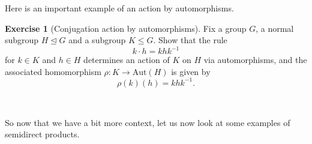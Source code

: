 \documentclass[12pt]{report}
\numberwithin{equation}{section}
\numberwithin{theorem}{chapter}
\theoremstyle{definition}
\newtheorem{exercise}{Exercise}
\newtheorem*{basic properties}{Basic Properties}
\newtheorem*{Important Remark}{Important Remark}
\newtheorem{remark}[theorem]{Remark}
\begin{document}
%


Here is an important example of an action by automorphisms.


\begin{exercise}[Conjugation action by automorphisms]
Fix a group $G$, a normal subgroup $H \trianglelefteq G$ and a subgroup $K \leq G$. Show that the rule
$$k \cdot h = khk^{-1}$$ 
for $k \in K$ and $h \in H$ determines an action of $K$ on $H$ via automorphisms, and the associated homomorphism $\rho\!: K \to \mathrm{Aut}(H)$ is given by 
$$\rho(k)(h) = khk^{-1}.$$ 	
\end{exercise}

\


So now that we have a bit more context, let us now look at some examples of semidirect products.
\end{document}
